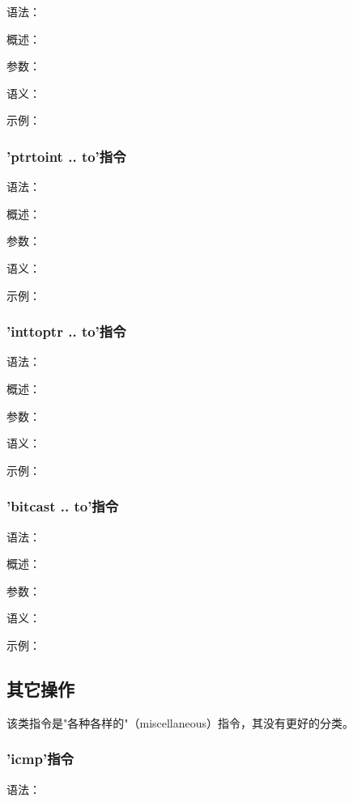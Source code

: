 \documentclass[12pt,a4paper]{article}
\begin{document}
{语法：

概述：

参数：

语义：

示例：


\subsubsection{'ptrtoint .. to'指令} %

语法：

概述：

参数：

语义：

示例：


\subsubsection{'inttoptr .. to'指令} %

语法：

概述：

参数：

语义：

示例：


\subsubsection{'bitcast .. to'指令} %

语法：

概述：

参数：

语义：

示例：


\subsection{其它操作}

该类指令是"各种各样的"（miscellaneous）指令，其没有更好的分类。

\subsubsection{'icmp'指令} %

语法：

}
\end{document}
